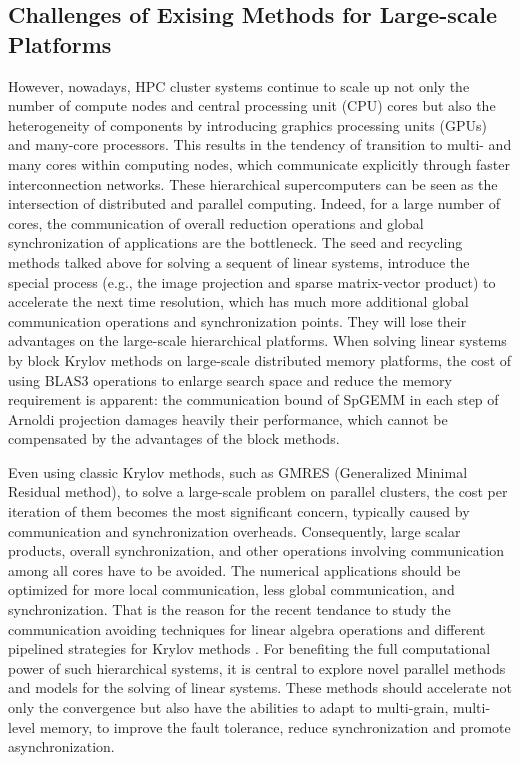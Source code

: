 \subsection{Challenges of Exising Methods for Large-scale Platforms}

However, nowadays, HPC cluster systems continue to scale up not only the number of compute nodes and central processing unit (CPU) cores but also the heterogeneity of components by introducing graphics processing units (GPUs) and many-core processors. This results in the tendency of transition to multi- and many cores within computing nodes, which communicate explicitly through faster interconnection networks. These hierarchical supercomputers can be seen as the intersection of distributed and parallel computing. Indeed, for a large number of cores, the communication of overall reduction operations and global synchronization of applications are the bottleneck. The seed and recycling methods talked above for solving a sequent of linear systems, introduce the special process (e.g., the image projection and sparse matrix-vector product) to accelerate the next time resolution, which has much more additional global communication operations and synchronization points. They will lose their advantages on the large-scale hierarchical platforms. When solving linear systems by block Krylov methods on large-scale distributed memory platforms, the cost of using BLAS3 operations to enlarge search space and reduce the memory requirement is apparent: the communication bound of SpGEMM in each step of Arnoldi projection damages heavily their performance, which cannot be compensated by the advantages of the block methods.

Even using classic Krylov methods, such as GMRES (Generalized Minimal Residual method), to solve a large-scale problem on parallel clusters, the cost per iteration of them becomes the most significant concern, typically caused by communication and synchronization overheads. Consequently, large scalar products, overall synchronization, and other operations involving communication among all cores have to be avoided. The numerical applications should be optimized for more local communication, less global communication, and synchronization. That is the reason for the recent tendance to study the communication avoiding techniques for linear algebra operations \cite{demmel2008avoiding, hoemmen2010communication, carson2015communication} and different pipelined strategies for Krylov methods \cite{ghysels2013hiding, morgan2016stochastic, cools2017communication}. For benefiting the full computational power of such hierarchical systems, it is central to explore novel parallel methods and models for the solving of linear systems. These methods should accelerate not only the convergence but also have the abilities to adapt to multi-grain, multi-level memory, to improve the fault tolerance, reduce synchronization and promote asynchronization.


